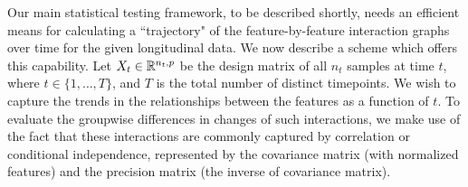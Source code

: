 Our main statistical testing framework, to be described shortly, needs an efficient means for calculating a ``trajectory" of the feature-by-feature interaction graphs over time
for the given longitudinal data. We now describe a scheme which offers this capability. 
Let $X_t \in \mathbb{R}^{n_t,p}$ be the design matrix of all $n_t$ samples at time $t$, where $t \in \{1,\ldots,T\}$, and $T$ is the total number of distinct timepoints.
We wish to capture the trends in the relationships between the features as a function of $t$. 
To evaluate the groupwise differences in changes of such interactions, we make use of the fact
that these interactions are commonly captured by correlation or conditional independence, represented by the covariance matrix (with normalized features)
and the precision matrix (the inverse of covariance matrix).

